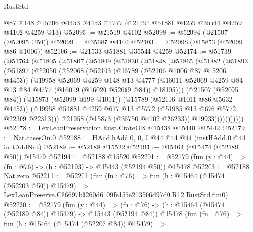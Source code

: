 \begin{lexlean}{RustStd}
\begin{coremodule}
    @87
    @148
    @15206
    @4453
    @4453
    @4777
    (@21497 @51881 @4259 @35544 @4259 @4102 @4259 @13)
@52095 := @21519 @4102
@52098 := @52094 (@21507 (@52095 @50))
@52099 := @35687 @4102
@52103 := @52098 (@15873 (@52099 @86 @1006))
@52106 := @21533 @51881 @35544 @4259
@52174 := @51739
    (@51764
      (@51805
        (@51807
          (@51809
            (@51830
              (@51848
                (@51865
                  (@51882
                    (@51893
                      (@51897
                        (@52050
                          (@52068
                            (@52103
                              (@15789 (@52106 @1006 @87 @15206 @4453))
                              (@19958
                                @52069
                                @4259
                                @148
                                @13
                                @4777
                                (@16011
                                  @52069
                                  @4259
                                  @84
                                  @13
                                  @84
                                  @4777
                                  (@16019 (@16020 @52069 @84))
                                  @18105)))
                            (@21507 (@52095 @84))
                            (@15873 (@52099 @199 @1011))
                            (@15789 (@52106 @1011 @86 @5632 @4453))
                            (@19958
                              @51881
                              @4259
                              @677
                              @13
                              @5772
                              (@51985 @13 @676 @5772 @22309 @22313)))
                          @21958
                          (@15873 (@35750 @4102 @26233))
                          @19933)))))))))))
@52178 := LexLeanPreservation.Rust.CrateOK @15438 @15440 @15442
@52179 := Nat.casesOn.{0}
@52188 := HAdd.hAdd.{0, 0, 0} @44 @44 @44 (instHAdd.{0} @44 instAddNat)
@52189 := @52188 @15522
@52193 := @15464 (@15474 (@52189 @50)) @15479
@52194 := @52188 @15520
@52201 := @52179 (fun (y : @44) => (fn : @76) -> (h : @52193) -> @15443 (@52194 @50)) @15478
@52203 := @52188 Nat.zero
@52211 := @52201
    (fun (fn : @76) =>
    fun (h : @15464 (@15474 (@52203 @50)) @15479) =>
    LexLeanPreserve.C86697b9260d6109fe156e213506d97d0.R12.RustStd.fun0)
@52230 := @52179
    (fun (y : @44) =>
    (fn : @76) -> (h : @15464 (@15474 (@52189 @84)) @15479) -> @15443 (@52194 @84))
    @15478
    (fun (fn : @76) =>
    fun (h : @15464 (@15474 (@52203 @84)) @15479) =>

\end{coremodule}
\end{lexlean}

